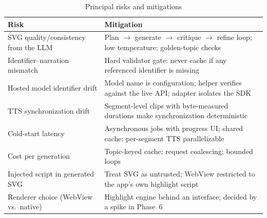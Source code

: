 \begin{table}[htbp]
\caption{Principal risks and mitigations}
\label{tab:risks}
\centering
\small
\renewcommand{\arraystretch}{1.3}
\begin{tabular}{@{}p{}p{}@{}}
\toprule
\textbf{Risk} & \textbf{Mitigation}\\
\midrule
SVG quality/consistency from the LLM & Plan $\to$ generate $\to$ critique
$\to$ refine loop; low temperature; golden-topic checks\\
Identifier--narration mismatch & Hard validator gate: never cache if any
referenced identifier is missing\\
Hosted model identifier drift & Model name is configuration; helper verifies
against the live API; adapter isolates the SDK\\
TTS synchronization drift & Segment-level clips with byte-measured durations
make synchronization deterministic\\
Cold-start latency & Asynchronous jobs with progress UI; shared cache;
per-segment TTS parallelizable\\
Cost per generation & Topic-keyed cache; request coalescing; bounded loops\\
Injected script in generated SVG & Treat SVG as untrusted; WebView restricted
to the app's own highlight script\\
Renderer choice (WebView vs.\ native) & Highlight engine behind an interface;
decided by a spike in Phase~6\\
\bottomrule
\end{tabular}
\end{table}
